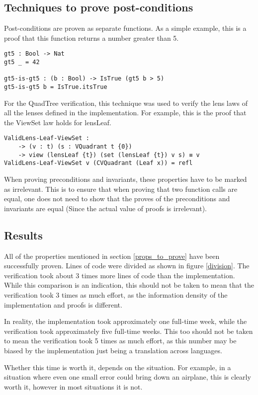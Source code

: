 \subsection{Techniques to prove post-conditions}
Post-conditions are proven as separate functions. As a simple example, this is a proof that this function returns a number greater than 5.
\begin{verbatim}
gt5 : Bool -> Nat
gt5 _ = 42

gt5-is-gt5 : (b : Bool) -> IsTrue (gt5 b > 5)
gt5-is-gt5 b = IsTrue.itsTrue
\end{verbatim}

For the QuadTree verification, this technique was used to verify the lens laws of all the lenses defined in the implementation. For example, this is the proof that the ViewSet law holds for lensLeaf.
\begin{verbatim}
ValidLens-Leaf-ViewSet : 
    -> (v : t) (s : VQuadrant t {0}) 
    -> view (lensLeaf {t}) (set (lensLeaf {t}) v s) ≡ v
ValidLens-Leaf-ViewSet v (CVQuadrant (Leaf x)) = refl
\end{verbatim}

When proving preconditions and invariants, these properties have to be marked as irrelevant. This is to ensure that when proving that two function calls are equal, one does not need to show that the proves of the preconditions and invariants are equal (Since the actual value of proofs is irrelevant).

\subsection{Results}
All of the properties mentioned in section \ref{props_to_prove} have been successfully proven. Lines of code were divided as shown in figure \ref{division}. The verification took about 3 times more lines of code than the implementation. While this comparison is an indication, this should not be taken to mean that the verification took 3 times as much effort, as the information density of the implementation and proofs is different.

In reality, the implementation took approximately one full-time week, while the verification took approximately five full-time weeks. This too should not be taken to mean the verification took 5 times as much effort, as this number may be biased by the implementation just being a translation across languages.

Whether this time is worth it, depends on the situation. For example, in a situation where even one small error could bring down an airplane, this is clearly worth it, however in most situations it is not.


